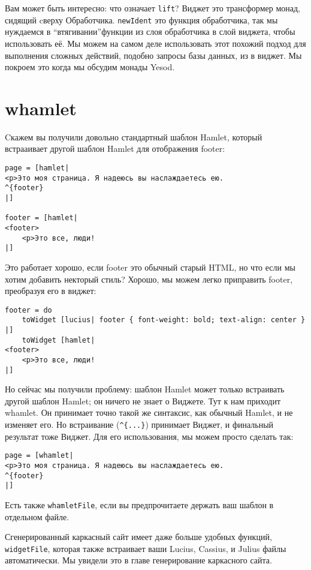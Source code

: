 Вам может быть интересно: что означает \lstinline'lift'? Виджет это трансформер монад, сидящий cверху Обработчика. \lstinline'newIdent' это функция обработчика, так мы нуждаемся в \textquotedblleft втягивании\textquotedblright функции из слоя обработчика в слой виджета, чтобы использовать её. Мы можем на самом деле использовать этот похожий подход для выполнения сложных действий, подобно запросы базы данных, из в виджет. Мы покроем это когда мы обсудим монады Yesod.

\section{whamlet}

Cкажем вы получили довольно стандартный шаблон Hamlet, который встрааивает другой шаблон Hamlet для отображения footer:

\begin{lstlisting}
page = [hamlet|
<p>Это моя страница. Я надеюсь вы наслаждаетесь ею.
^{footer}
|]

footer = [hamlet|
<footer>
    <p>Это все, люди!
|]
\end{lstlisting}

Это работает хорошо, если footer это обычный старый HTML, но что если мы хотим добавить некторый стиль? Хорошо, мы можем легко приправить footer, преобразуя его в виджет:

\begin{lstlisting}
footer = do
    toWidget [lucius| footer { font-weight: bold; text-align: center } |]
    toWidget [hamlet|
<footer>
    <p>Это все, люди!
|]
\end{lstlisting}

Но сейчас мы получили проблему: шаблон Hamlet может только встраивать другой шаблон Hamlet; он ничего не знает о Виджете. Тут к нам приходит whamlet. Он принимает точно такой же синтаксис, как обычный Hamlet, и не изменяет его. Но встраивание (\lstinline!^{...}!) принимает Виджет, и финальный результат тоже Виджет. Для его использования, мы можем просто сделать так:

\begin{lstlisting}
page = [whamlet|
<p>Это моя страница. Я надеюсь вы наслаждаетесь ею.
^{footer}
|]
\end{lstlisting}


Есть также \lstinline'whamletFile', если вы предпрочитаете держать ваш шаблон в отдельном файле.

Сгенерированный каркасный сайт имеет даже больше удобных функций, \lstinline'widgetFile', которая также встраивает ваши Lucius, Cassius, и Julius файлы автоматически. Мы увидели это в главе генерирование каркасного сайта. %

